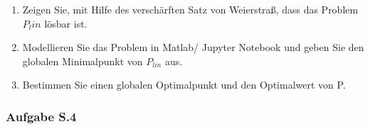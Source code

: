 \documentclass[12pt]{extreport} %
\newcommand{\R}{\mathbb{R}}
\theoremstyle{named}
\theoremstyle{nnamed}
\theoremstyle{itshape}
\theoremstyle{normal}
\begin{document}
\begin{enumerate}
\begin{proof}
			\begin{align*}
				\tilde{f}(x) & = -\min\big\{- x_1 - 3, -\left|x_2 - 4\right|, x_1 + x_2 - 20\big\} \\
				& = ~~ \max\big\{ x_1 + 3, \left|x_2 - 4\right|, -(x_1 + x_2) + 20\big\}.  
			\end{align*} 
			Aus der Epigraph-Formulierung bedeutet die  Bedingung $\tilde{f}(x) \leq \alpha$, dass jede Komponente des Maximums kleiner gleich $\alpha$ sein muss, d.h. das folgende Problem besitzt die selben Optimalpunkte wie $P_{epi}$:
			$$  \tilde{P}_{epi}: \min_{(x, \alpha) \in \R^2 \times R} e^{\alpha} \text{ s.t. } x \in X, \begin{cases} x_1 + 3 \leq \alpha \\
			 x_2 - 4 \leq \alpha, ~ - x_2 + 4 \geq - \alpha \\ -(x_1 + x_2) + 20 \leq \alpha \end{cases} $$
			 Da die Exponentialfunktion streng monoton ist, ist jedes Minimum der Identität auf dieser Menge gleich dem Minimum der Exponentialfunktion. D.h. ein lineares Optimierungsproblem $P_{lin}$, welches die selben Optimalpunkte wie $P_{epi}$ besitzt, lautet
			$$  \tilde{P}_{epi}: \min_{(x, \alpha) \in \R^2 \times R} \alpha \text{ s.t. } x \in X, \begin{cases} x_1 + 3 \leq \alpha \\
			 x_2 - 4 \leq \alpha, ~ - x_2 + 4 \geq - \alpha \\ -(x_1 + x_2) + 20 \leq \alpha \end{cases} $$			 
		\end{proof}
	\item Zeigen Sie, mit Hilfe des verschärften Satz von Weierstraß, dass das Problem $P_lin$ lösbar ist.
	\item Modellieren Sie das Problem in Matlab/ Jupyter Notebook und geben Sie den globalen Minimalpunkt von $P_{lin}$ aus.
	\item Bestimmen Sie einen globalen Optimalpunkt und den Optimalwert von P.
\end{enumerate}

\newpage

\subsubsection{Aufgabe S.4} ~\\
\end{document}
